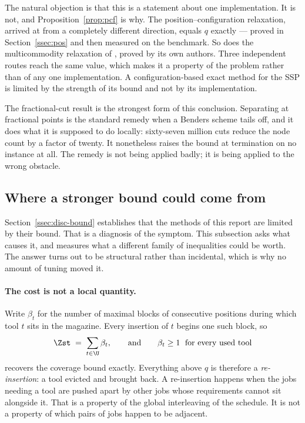 The natural objection is that this is a statement about one implementation. It is not,
and Proposition~\ref{prop:pcf} is why. The position--configuration relaxation, arrived
at from a completely different direction, equals $q$ exactly --- proved in
Section~\ref{ssec:pos} and then measured on the benchmark. So does the multicommodity
relaxation of \citet{daSilva2024}, proved by its own authors. Three independent routes reach the same value, which makes it a property of the
problem rather than of any one implementation.
A configuration-based exact method for the SSP is limited by the strength of its bound
and not by its implementation.

The fractional-cut result is the strongest form of this conclusion. Separating at
fractional points is the standard remedy when a Benders scheme tails off, and it does
what it is supposed to do locally: sixty-seven million cuts reduce the node count by a
factor of twenty. It nonetheless raises the bound at termination on no instance at all.
The remedy is not being applied badly; it is being applied to the wrong obstacle.

\subsection{Where a stronger bound could come from}\label{ssec:disc-locality}

Section~\ref{ssec:disc-bound} establishes that the methods of this report are limited
by their bound. That is a diagnosis of the symptom. This subsection asks what causes
it, and measures what a different family of inequalities could be worth. The answer
turns out to be structural rather than incidental, which is why no amount of tuning
moved it.

\paragraph{The cost is not a local quantity.}
Write $\beta_t$ for the number of maximal blocks of consecutive positions during which
tool $t$ sits in the magazine. Every insertion of $t$ begins one such block, so
\[
  \Zst \;=\; \sum_{t\in\U}\beta_t ,
\qquad\text{and}\qquad
  \beta_t\ge 1 \;\text{ for every used tool}
\]
recovers the coverage bound exactly. Everything above $q$ is therefore a
\emph{re-insertion}: a tool evicted and brought back. A re-insertion happens when the
jobs needing a tool are pushed apart by other jobs whose requirements cannot sit
alongside it. That is a property of the global interleaving of the schedule. It is not
a property of which pairs of jobs happen to be adjacent.

